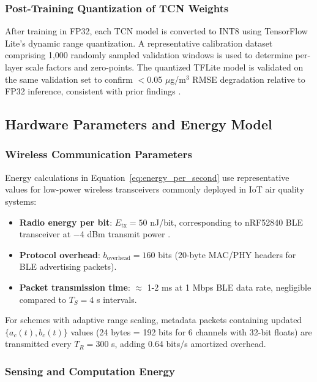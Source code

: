 \subsubsection{Post-Training Quantization of TCN Weights}

After training in FP32, each TCN model is converted to INT8 using TensorFlow Lite's dynamic range quantization. A representative calibration dataset comprising 1,000 randomly sampled validation windows is used to determine per-layer scale factors and zero-points. The quantized TFLite model is validated on the same validation set to confirm $<$0.05 $\mu$g/m$^3$ RMSE degradation relative to FP32 inference, consistent with prior findings \cite{mazinani2025air}.

\subsection{Hardware Parameters and Energy Model}

\subsubsection{Wireless Communication Parameters}

Energy calculations in Equation~\eqref{eq:energy_per_second} use representative values for low-power wireless transceivers commonly deployed in IoT air quality systems:

\begin{itemize}
\item \textbf{Radio energy per bit}: $E_{\text{tx}} = 50$ nJ/bit, corresponding to nRF52840 BLE transceiver at $-$4 dBm transmit power \cite{khan2024artificial}.
\item \textbf{Protocol overhead}: $b_{\text{overhead}} = 160$ bits (20-byte MAC/PHY headers for BLE advertising packets).
\item \textbf{Packet transmission time}: $\approx$ 1-2 ms at 1 Mbps BLE data rate, negligible compared to $T_S = 4$ s intervals.
\end{itemize}

For schemes with adaptive range scaling, metadata packets containing updated $\{a_c(t), b_c(t)\}$ values (24 bytes = 192 bits for 6 channels with 32-bit floats) are transmitted every $T_R = 300$ s, adding 0.64 bits/s amortized overhead.

\subsubsection{Sensing and Computation Energy}

